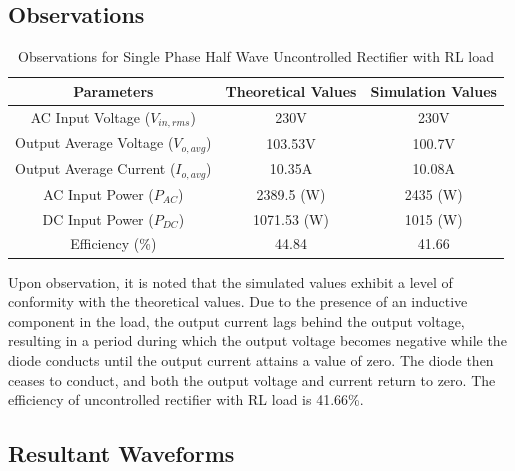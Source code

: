 \subsection{Observations}

\begin{table}[h]
    \renewcommand{\arraystretch}{1.3}
    \label{table_observation_single-phase-half-wave-uncontrolled-rectifier-with-RL-load}
    \centering
    \begin{tabular}{|c|c|c|}
        \hline
        Parameters                              & Theoretical Values & Simulation Values \\
        \hline
        \hline
        AC Input Voltage ($ V_{in,rms} $)       & 230V               & 230V              \\
        \hline
        Output Average Voltage ($ V_{o,avg} $)  & 103.53V            & 100.7V            \\
        \hline
        Output Average Current ($ I_{o,avg}  $) & 10.35A             & 10.08A            \\
        \hline
        AC Input Power ($ P_{AC} $)             & 2389.5 (W)         & 2435 (W)          \\
        \hline
        DC Input Power ($ P_{DC} $)             & 1071.53 (W)        & 1015 (W)          \\
        \hline
        Efficiency (\%)                         & 44.84              & 41.66             \\
        \hline
    \end{tabular}
    \caption{Observations for Single Phase Half Wave Uncontrolled Rectifier with RL load}

\end{table}


Upon observation, it is noted that the simulated values exhibit a level of conformity with the theoretical values. Due to the presence of an inductive component in the load, the output current lags behind the output voltage, resulting in a period during which the output voltage becomes negative while the diode conducts until the output current attains a value of zero. The diode then ceases to conduct, and both the output voltage and current return to zero.
The efficiency of uncontrolled rectifier with RL load is 41.66\%.
\pagebreak


\subsection{Resultant Waveforms}

